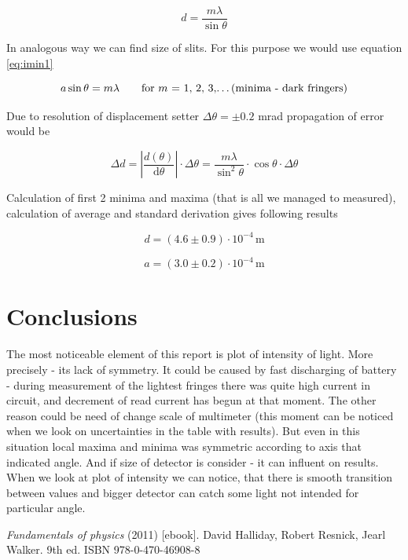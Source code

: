 \documentclass[a4paper,12pt]{article}
\begin{document}
\begin{equation}
    d = \frac{m \lambda}{\sin \theta} \label{eq:imax2}
\end{equation}

In analogous way we can find size of slits. For this purpose we would use equation \ref{eq:imin1}

\begin{equation}
    a \sin \theta = m \lambda \qquad \textrm{for $m$ = 1, 2, 3,\dots (minima - dark fringers)} \label{eq:imin1}
\end{equation}

Due to resolution of displacement setter $\Delta \theta = \pm 0.2$ mrad propagation of error would be

\begin{equation}
    \Delta d = \left| \frac{d(\theta)}{\mathrm{d} \theta} \right| \cdot \Delta \theta =\frac{m \lambda}{\sin^2 \theta} \cdot \cos \theta \cdot \Delta \theta
\end{equation}




Calculation of first 2 minima and maxima (that is all we managed to measured), calculation of average and standard derivation gives following results

\begin{displaymath}
    d = (4.6 \pm 0.9) \cdot 10^{-4} \, \mathrm{m}
\end{displaymath}

\begin{displaymath}
    a = (3.0 \pm 0.2) \cdot 10^{-4} \, \mathrm{m}
\end{displaymath}


\section{Conclusions}
The most noticeable element of this report is plot of intensity of light. More precisely - its lack of symmetry. It could be caused by fast discharging of battery - during measurement of the lightest fringes there was quite high current in circuit, and decrement of read current has begun at that moment. The other reason could be need of change scale of multimeter (this moment can be noticed when we look on uncertainties in the table with results). But even in this situation local maxima and minima was symmetric according to axis that indicated angle. And if size of detector is consider - it can influent on results. When we look at plot of intensity we can notice, that there is smooth transition between values and bigger detector can catch some light not intended for particular angle.       


\begin{thebibliography}{9}
    \emph{Fundamentals of physics} (2011) [ebook]. David Halliday, Robert Resnick, Jearl Walker. 9th ed. ISBN 978-0-470-46908-8
\end{thebibliography}
\end{document}
